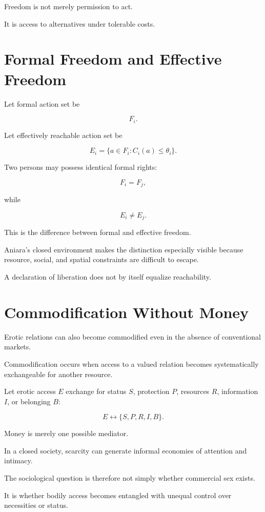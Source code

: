 \documentclass[11pt,oneside]{book}
\theoremstyle{definition}
\theoremstyle{remark}
\begin{document}
Freedom is not merely permission to act.

It is access to alternatives under tolerable costs.

\section{Formal Freedom and Effective Freedom}

Let formal action set be

\[
F_i.
\]

Let effectively reachable action set be

\[
E_i
=
\{
a\in F_i:
C_i(a)\leq\theta_i
\}.
\]

Two persons may possess identical formal rights:

\[
F_i=F_j,
\]

while

\[
E_i\neq E_j.
\]

This is the difference between formal and effective freedom.

Aniara's closed environment makes the distinction especially visible because resource, social, and spatial constraints are difficult to escape.

A declaration of liberation does not by itself equalize reachability.

\section{Commodification Without Money}

Erotic relations can also become commodified even in the absence of conventional markets.

Commodification occurs when access to a valued relation becomes systematically exchangeable for another resource.

Let erotic access \(E\) exchange for status \(S\), protection \(P\), resources \(R\), information \(I\), or belonging \(B\):

\[
E
\leftrightarrow
\{S,P,R,I,B\}.
\]

Money is merely one possible mediator.

In a closed society, scarcity can generate informal economies of attention and intimacy.

The sociological question is therefore not simply whether commercial sex exists.

It is whether bodily access becomes entangled with unequal control over necessities or status.
\end{document}
